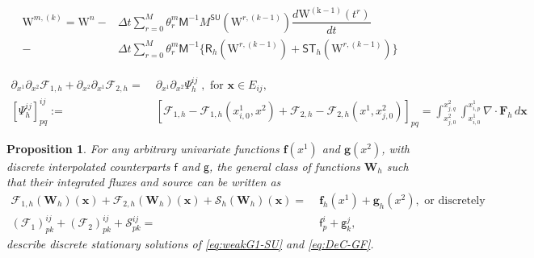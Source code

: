 \documentclass[10pt,a4paper]{amsart}
\newtheorem{proposition}{Proposition}
\begin{document}
\begin{equation}
	\label{eq:DeC-GF}
	\begin{split}
	     \mathrm{W}^{m,(k)}  =            \mathrm{W}^n
	- &\Delta t \sum_{r=0}^M \theta_r^m \mathsf{M}^{-1}  M^{\textsf{SU}}(\mathrm{W}^{r,(k-1)}) \dfrac{d\mathrm{W^{(k-1)}}(t^r)}{dt} \\
	-& \Delta t \sum_{r=0}^M \theta_r^m \mathsf{M}^{-1}  \{ \textsf{R}_h(\mathrm{W}^{r,(k-1)})    + \mathsf{ST}_h(\mathrm{W}^{r,(k-1)}) \}
	 \end{split}
\end{equation}

 \begin{equation}\label{eq:Phi_gf}
 \begin{aligned}
  \partial_{x^1} \partial_{x^2} \mathcal{F}_{1,h} + \partial_{x^2}\partial_{x^1} \mathcal{F}_{2,h} =   & \; \partial_{x^1} \partial_{x^2}\Psi^{ij}_h\;, \text{ for }\mathbf{x} \in E_{ij},  \\
[  \Psi^{ij}_h]^{ij}_{pq} := &\;[\mathcal{F}_{1,h} - \mathcal{F}_{1,h}(x^1_{i,0},x^2) + \mathcal{F}_{2,h} - \mathcal{F}_{2,h}(x^1, x^2_{j,0})]_{pq} =  \int_{x^2_{j,0}}^{x^2_{j,q}} \int_{x^1_{i,0}}^{x^1_{i,p}} \nabla\cdot\mathbf{F}_h\,d\mathbf{x}
  \end{aligned}
 \end{equation}

\begin{proposition}\label{prop:equilibria}
For any arbitrary  univariate functions $\mathbf{f}(x^1)$ and $\mathbf{g}(x^2)$, with discrete interpolated counterparts $\mathsf{f}$ and $\mathsf{g}$,
the general class of functions $\mathbf{W}_h$ such that their integrated fluxes and source can be written as 
\begin{equation}\label{eq:equilibria}
	\begin{split}
	 \mathcal{F}_{1,h}(\mathbf{W}_h)(\mathbf{x}) + \mathcal{F}_{2,h}(\mathbf{W}_h)(\mathbf{x}) + \mathcal{S}_h(\mathbf{W}_h)(\mathbf{x}) = &\; \mathbf{f}_h(x^1)+\mathbf{g}_h(x^2) , \text { or discretely}\\[5pt]
		(\mathcal{F}_{1})^{ij}_{pk} + (\mathcal{F}_{2})^{ij}_{pk} + \mathcal{S}^{ij}_{pk} =& \; \mathsf{f}^i_p + \mathsf{g}^j_k,
	\end{split}
\end{equation} 
describe discrete stationary solutions of \eqref{eq:weakG1-SU} and \eqref{eq:DeC-GF}.
\end{proposition}
\end{document}
